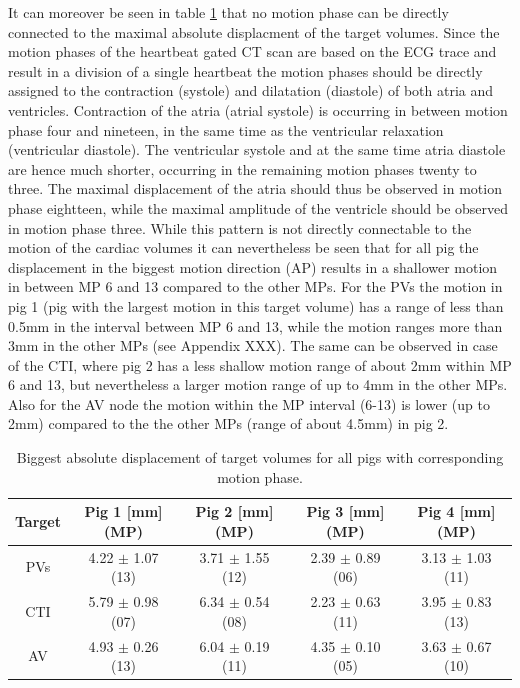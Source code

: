 \documentclass[type=dr, dr=rernat, accentcolor=tud7b,colorbacktitle, bigchapter, openright, twoside, 12pt ]{tudthesis}
\begin{document}
\newline
It can moreover be seen in table \ref{tab:maxabsmotion_allpigs} that no motion phase can be directly connected to the maximal absolute 
displacment of the target volumes. Since the motion phases of the heartbeat gated CT scan are based on the ECG trace and result in a division 
of a single heartbeat the motion phases should be directly assigned to the contraction (systole) and dilatation (diastole) of both atria and 
ventricles. Contraction of the atria (atrial systole) is occurring in between motion phase four and nineteen, in the same time as the 
ventricular relaxation (ventricular diastole). The ventricular systole and at the same time atria diastole are hence much shorter, occurring 
in the remaining motion phases twenty to three. The maximal displacement of the atria should thus be observed in motion phase eightteen, while 
the maximal amplitude of the ventricle should be observed in motion phase three. 
While this pattern is not directly connectable to the motion of the cardiac volumes it can nevertheless be seen that for all pig the 
displacement in the biggest motion direction (AP) results in a shallower motion in between MP 6 and 13 compared to the other MPs. 
For the PVs the motion in pig 1 (pig with the largest motion in this target volume) has a range of less than 0.5mm in the interval between MP 
6 and 13, while the motion ranges more than 3mm in the other MPs (see Appendix XXX). The same can be observed in case of the CTI, where pig 2 
has a less shallow motion range of about 2mm within MP 6 and 13, but nevertheless a larger motion range of up to 4mm in the other MPs. 
Also for the AV node the motion within the MP interval (6-13) is lower (up to 2mm) compared to the the other MPs (range of about 4.5mm) 
in pig 2. 

\begin{table}[H]
  \centering
  \caption{Biggest absolute displacement of target volumes for all pigs with corresponding motion phase.}
  \begin{tabular}{|c|c|c|c|c|}
    \hline\hline
    Target & Pig 1 [mm] (MP) & Pig 2 [mm] (MP) & Pig 3 [mm] (MP) & Pig 4 [mm] (MP) \\
    \hline
    PVs & 4.22 $\pm$ 1.07 (13) & 3.71 $\pm$ 1.55 (12) & 2.39 $\pm$ 0.89 (06) & 3.13 $\pm$ 1.03 (11) \\
    CTI & 5.79 $\pm$ 0.98 (07) & 6.34 $\pm$ 0.54 (08) & 2.23 $\pm$ 0.63 (11) & 3.95 $\pm$ 0.83 (13) \\
    AV & 4.93 $\pm$ 0.26 (13) & 6.04 $\pm$ 0.19 (11) & 4.35 $\pm$ 0.10 (05)  & 3.63 $\pm$ 0.67 (10) \\
    \hline\hline
  \end{tabular}
  \label{tab:maxabsmotion_allpigs}
\end{table}
\end{document}
